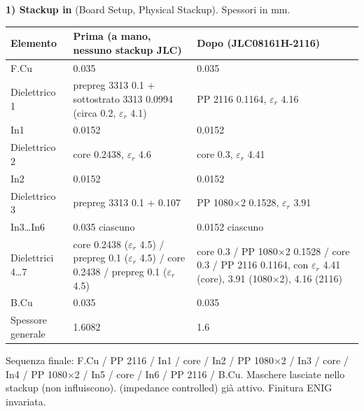 \textbf{1) Stackup in } (Board Setup, Physical Stackup). Spessori in \si{\milli\metre}.
\begin{center}
\small
\begin{tabular}{@{}p{2.6cm}p{6.2cm}p{6.0cm}@{}}
\toprule
Elemento & Prima (a mano, nessuno stackup JLC) & Dopo (JLC08161H-2116)\\
\midrule
F.Cu & \num{0,035} & \num{0,035}\\
Dielettrico 1 & prepreg 3313 \num{0,1} + sottostrato 3313 \num{0,0994} (circa \num{0,2}, $\varepsilon_r$ \num{4,1}) & PP 2116 \num{0,1164}, $\varepsilon_r$ \num{4,16}\\
In1 & \num{0,0152} & \num{0,0152}\\
Dielettrico 2 & core \num{0,2438}, $\varepsilon_r$ \num{4,6} & core \num{0,3}, $\varepsilon_r$ \num{4,41}\\
In2 & \num{0,0152} & \num{0,0152}\\
Dielettrico 3 & prepreg 3313 \num{0,1} + \num{0,107} & PP 1080$\times$2 \num{0,1528}, $\varepsilon_r$ \num{3,91}\\
In3\ldots In6 & \num{0,035} ciascuno & \num{0,0152} ciascuno\\
Dielettrici 4\ldots 7 & core \num{0,2438} ($\varepsilon_r$ \num{4,5}) / prepreg \num{0,1} ($\varepsilon_r$ \num{4,5}) / core \num{0,2438} / prepreg \num{0,1} ($\varepsilon_r$ \num{4,5}) & core \num{0,3} / PP 1080$\times$2 \num{0,1528} / core \num{0,3} / PP 2116 \num{0,1164}, con $\varepsilon_r$ \num{4,41} (core), \num{3,91} (1080$\times$2), \num{4,16} (2116)\\
B.Cu & \num{0,035} & \num{0,035}\\
Spessore generale & \num{1,6082} & \num{1,6}\\
\bottomrule
\end{tabular}
\end{center}
Sequenza finale: F.Cu / PP 2116 / In1 / core / In2 / PP 1080$\times$2 / In3 / core / In4 / PP 1080$\times$2 / In5 / core / In6 / PP 2116 / B.Cu. Maschere lasciate nello stackup (non influiscono).  (impedance controlled) già attivo. Finitura ENIG invariata.

